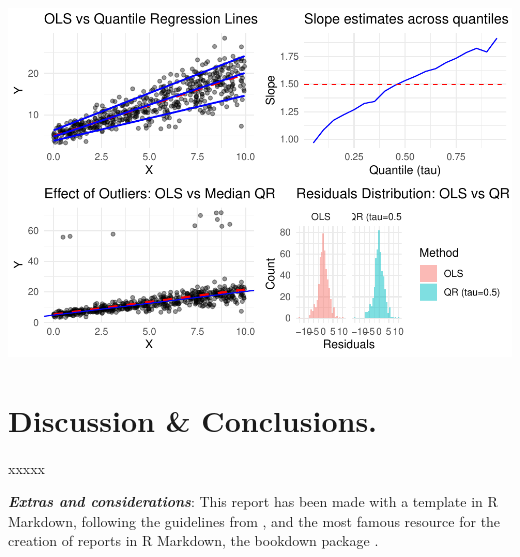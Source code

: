 \documentclass[fleqn,8pt]{latex/stylish_article} %
\begin{document}
\begin{center}\includegraphics[width=0.8\linewidth]{ADR_project_files/figure-latex/other-plots-1} \end{center}

\section{Discussion \& Conclusions.}\label{discussion-conclusions.}

xxxxx

\textbf{\emph{Extras and considerations}}: This report has been made with a template in R Markdown, following the guidelines from \citep{Marcon2025}, and the most famous resource for the creation of reports in R Markdown, the bookdown package \citep{Xie2016}.



\makeatletter

\makeatother


\end{document}

